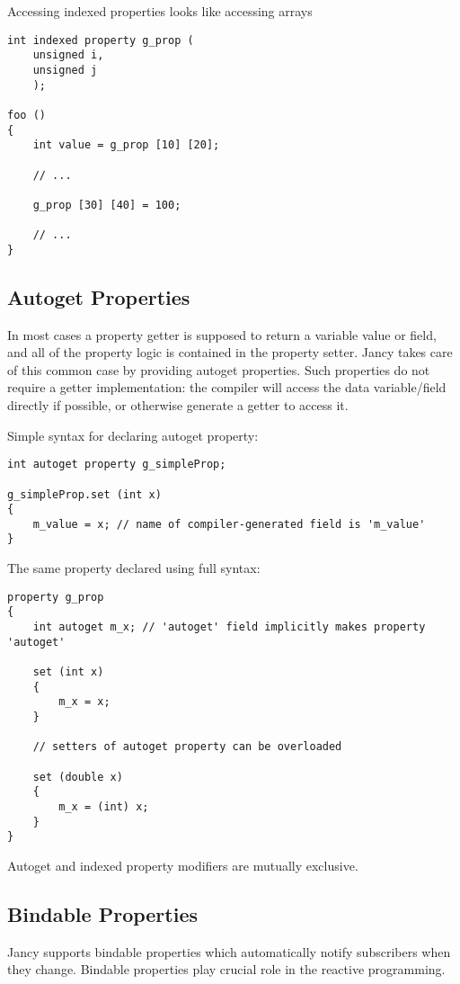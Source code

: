 \documentclass[oneside]{book}
\begin{document}
Accessing indexed properties looks like accessing arrays

\begin{lstlisting}
int indexed property g_prop (
    unsigned i,
    unsigned j
    );

foo ()
{
    int value = g_prop [10] [20];

    // ...

    g_prop [30] [40] = 100;

    // ...
}
\end{lstlisting}

\subsection{Autoget Properties}
In most cases a property getter is supposed to return a variable value or field, and all of the property logic is contained in the property setter. Jancy takes care of this common case by providing autoget properties. Such properties do not require a getter implementation: the compiler will access the data variable/field directly if possible, or otherwise generate a getter to access it.

Simple syntax for declaring autoget property:

\begin{lstlisting}
int autoget property g_simpleProp;

g_simpleProp.set (int x)
{
    m_value = x; // name of compiler-generated field is 'm_value'
}
\end{lstlisting}

The same property declared using full syntax:

\begin{lstlisting}
property g_prop
{   
    int autoget m_x; // 'autoget' field implicitly makes property 'autoget'

    set (int x)
    {
        m_x = x;
    }

    // setters of autoget property can be overloaded

    set (double x)
    {
        m_x = (int) x;
    }
}
\end{lstlisting}

Autoget and indexed property modifiers are mutually exclusive.

\subsection{Bindable Properties}
Jancy supports bindable properties which automatically notify subscribers when they change. Bindable properties play crucial role in the reactive programming.
\end{document}
